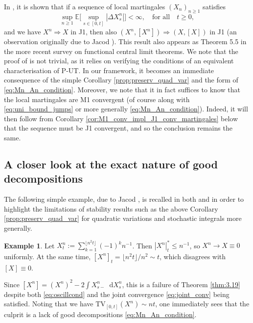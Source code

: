 \documentclass[11pt]{article}
\theoremstyle{definition}\newtheorem{example}[theorem]{Example}
\theoremstyle{definition}\newtheorem{counterexample}[theorem]{Counterexample}
\theoremstyle{definition}\newtheorem{remark}[theorem]{Remark}
\theoremstyle{definition}\newtheorem{defi}[theorem]{Definition}
\numberwithin{equation}{section}
\newcommand*\diff{\mathop{}\!\mathrm{d}}								%
\renewcommand{\|}{\; : \, \;}											%
\begin{document}
In \cite[Cor.~VI.6.30]{shiryaev}, it is shown that if a sequence of local martingales $(X_n)_{n\geq1 }$ satisfies
\begin{equation}\label{eq:uni_bound_jumps}
	\operatorname{sup}_{n\geq 1} \mathbb{E} \bigl[ \operatorname{sup}_{s\in[0,t]} |\Delta X_s^n| \bigr] <\infty, \quad \text{for all}\quad t\geq 0,
\end{equation}
and we have $X^n \Rightarrow X$ in J1, then also $(X^n,[X^n])\Rightarrow (X, [X])$ in J1 (an observation originally due to Jacod \cite{jacod}). This result also appears as Theorem 5.5 in the more recent survey \cite{whitt_FCLT} on functional central limit theorems. We note that the proof of \cite[Cor.~VI.6.30]{shiryaev} is not trivial, as it relies on verifying the conditions of an equivalent characterisation of P-UT. In our framework, it becomes an immediate consequence of the simple Corollary \ref{prop:preserv_quad_var} and the form of \eqref{eq:Mn_An_condition}. Moreover, we note that it in fact suffices to know that the local martingales are M1 convergent (of course along with \eqref{eq:uni_bound_jumps} or more generally \eqref{eq:Mn_An_condition}). Indeed, it will then follow from Corollary \ref{cor:M1_conv_impl_J1_conv_martingales} below that the sequence must be J1 convergent, and so the conclusion remains the same.



\subsection{A closer look at the exact nature of good decompositions}\label{sect:GD_role_sharpness}


The following simple example, due to Jacod \cite{jacod}, is recalled in both \cite[Example 7.14]{graham} and \cite[Example VI.6.27]{shiryaev} in order to highlight the limitations of stability results such as the above Corollary \ref{prop:preserv_quad_var} for quadratic variations and stochastic integrals more generally.

\begin{example}\label{eq:quad_var}Let $X^n_t:=\sum_{k=1}^{\lfloor n^2t \rfloor}(-1)^kn^{-1}$. Then $|X^n|_t^*\leq n^{-1}$, so $X^n \rightarrow X \equiv 0$ uniformly. At the same time, $[X^n]_t =  \lfloor n^2t \rfloor / n^2 \sim t$, which disagrees with $[X]\equiv 0$.
\end{example}
Since $[X^n]=(X^n)^2 - 2 \int X^n_{s-}\diff X^n_s$, this is a failure of Theorem \ref{thm:3.19} despite both \eqref{eq:oscillcond} and the joint convergence \eqref{eq:joint_conv} being satisfied. Noting that we have $\text{TV}_{[0,t]}(X^n) \sim nt $, one immediately sees that the culprit is a lack of good decompositions \eqref{eq:Mn_An_condition}.
\end{document}
